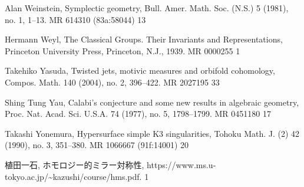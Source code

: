 {\begin{list}{}{%
  \setlength{\leftmargin}{3.8em}%
  \setlength{\itemindent}{-3.8em}%
  \setlength{\itemsep}{1.5pt}%
  \setlength{\parsep}{0pt}%
  \setlength{\listparindent}{0pt}%
}
\item[{[Wei81]}] Alan Weinstein, Symplectic geometry, Bull. Amer. Math. Soc. (N.S.) 5 (1981), no. 1, 1--13. MR 614310 (83a:58044) 13
\item[{[Wey39]}] Hermann Weyl, The Classical Groups. Their Invariants and Representations, Princeton University Press, Princeton, N.J., 1939. MR 0000255 1
\item[{[Yas04]}] Takehiko Yasuda, Twisted jets, motivic measures and orbifold cohomology, Compos. Math. 140 (2004), no. 2, 396--422. MR 2027195 33
\item[{[Yau77]}] Shing Tung Yau, Calabi’s conjecture and some new results in algebraic geometry, Proc. Nat. Acad. Sci. U.S.A. 74 (1977), no. 5, 1798--1799. MR 0451180 17
\item[{[Yon90]}] Takashi Yonemura, Hypersurface simple K3 singularities, Tohoku Math. J. (2) 42 (1990), no. 3, 351--380. MR 1066667 (91f:14001) 20
\item[{[植]}] 植田一石, ホモロジー的ミラー対称性, https://www.ms.u-tokyo.ac.jp/\textasciitilde kazushi/course/hms.pdf. 1
\end{list}
}


